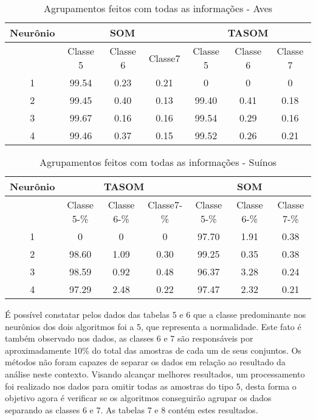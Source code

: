 \begin{table}[h]
\centering
\caption{Agrupamentos feitos com todas as informações - Aves}
\label{my-label}
\begin{tabular}{|c|c|c|c|c|c|c|}
\hline
Neurônio & \multicolumn{3}{c|}{SOM}      & \multicolumn{3}{c|}{TASOM}     \\ \hline
         & Classe 5 & Classe 6 & Classe7 & Classe 5 & Classe 6 & Classe 7 \\ \hline
1        & 99.54    & 0.23     & 0.21    & 0        & 0        & 0        \\ \hline
2        & 99.45        & 0.40        & 0.13       & 99.40    & 0.41     & 0.18     \\ \hline
3        & 99.67       & 0.16        & 0.16       & 99.54    & 0.29     & 0.16     \\ \hline
4        & 99.46    & 0.37     & 0.15    & 99.52    & 0.26     & 0.21     \\ \hline
\end{tabular}
\end{table}

\begin{table}[h]
\centering
\caption{Agrupamentos feitos com todas as informações - Suínos}
\label{my-label}
\begin{tabular}{|c|c|c|c|c|c|c|}
\hline
Neurônio & \multicolumn{3}{c|}{TASOM}      & \multicolumn{3}{c|}{SOM}     \\ \hline
         & Classe 5-\% & Classe 6-\% & Classe7-\% & Classe 5-\% & Classe 6-\% & Classe 7-\% \\ \hline
1        & 0        & 0        & 0       & 97.70    & 1.91     & 0.38     \\ \hline
2        & 98.60    & 1.09     & 0.30    & 99.25        & 0.35        & 0.38        \\ \hline
3        & 98.59    & 0.92     & 0.48    & 96.37        & 3.28        & 0.24        \\ \hline
4        & 97.29    & 2.48     & 0.22    & 97.47    & 2.32     & 0.21     \\ \hline
\end{tabular}
\end{table}

É possível constatar pelos dados das tabelas 5 e 6 que a classe predominante nos neurônios dos dois algoritmos foi a 5, que representa a normalidade. Este fato é também observado nos dados, as classes 6 e 7 são responsáveis por aproximadamente 10\% do total das amostras de cada um de seus conjuntos. Os métodos não foram capazes de separar os dados em relação ao resultado da análise neste contexto. Visando alcançar melhores resultados, um processamento foi realizado nos dados para omitir todas as amostras do tipo 5, desta forma o objetivo agora é verificar se os algoritmos conseguirão agrupar os dados separando as classes 6 e 7. As tabelas 7 e 8 contém estes resultados.

